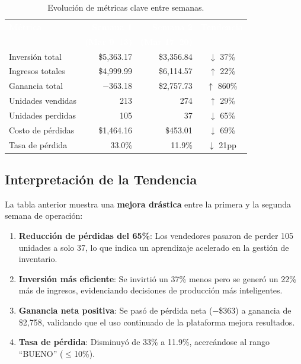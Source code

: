 \documentclass[12pt,letterpaper]{article}
\begin{document}
\begin{table}[H]
\centering
\footnotesize
{}
\begin{tabular}{l r r c}
\toprule
\rowcolor{tabheader}
\textcolor{white}{\textbf{Métrica}} &
\textcolor{white}{\textbf{Semana 1}} &
\textcolor{white}{\textbf{Semana 2}} &
\textcolor{white}{\textbf{Tendencia}} \\
& \textcolor{white}{\textbf{(Mar 9--13)}} &
\textcolor{white}{\textbf{(Mar 17--20)}} & \\
\midrule
Inversión total       & \$5,363.17  & \$3,356.84  & $\downarrow$ 37\% \\
Ingresos totales      & \$4,999.99  & \$6,114.57  & \textcolor{success}{$\uparrow$ 22\%} \\
Ganancia total        & $-$363.18   & \$2,757.73  & \textcolor{success}{$\uparrow$ 860\%} \\
Unidades vendidas     & 213         & 274         & \textcolor{success}{$\uparrow$ 29\%} \\
Unidades perdidas     & 105         & 37          & \textcolor{success}{$\downarrow$ 65\%} \\
Costo de pérdidas     & \$1,464.16  & \$453.01    & \textcolor{success}{$\downarrow$ 69\%} \\
Tasa de pérdida       & 33.0\%      & 11.9\%      & \textcolor{success}{$\downarrow$ 21pp} \\
\bottomrule
\end{tabular}
\caption{Evolución de métricas clave entre semanas.}
\end{table}

\subsection{Interpretación de la Tendencia}

La tabla anterior muestra una \textbf{mejora drástica} entre la primera y la segunda semana de operación:

\begin{enumerate}[leftmargin=2em]
    \item \textbf{Reducción de pérdidas del 65\%}: Los vendedores pasaron de perder 105 unidades a solo 37, lo que indica un aprendizaje acelerado en la gestión de inventario.
    \item \textbf{Inversión más eficiente}: Se invirtió un 37\% menos pero se generó un 22\% más de ingresos, evidenciando decisiones de producción más inteligentes.
    \item \textbf{Ganancia neta positiva}: Se pasó de pérdida neta ($-$\$363) a ganancia de \$2,758, validando que el uso continuado de la plataforma mejora resultados.
    \item \textbf{Tasa de pérdida}: Disminuyó de 33\% a 11.9\%, acercándose al rango ``BUENO'' ($\leq$10\%).
\end{enumerate}
\end{document}
